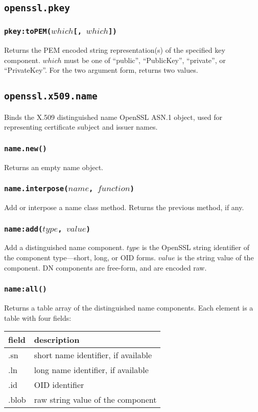 \documentclass[11pt, oneside]{memoir}
\newcommand*{\fn}[1]{\texttt{#1}\xspace}
\newcounter{toccols}
\newenvironment{Module}[1]{
	\subsection{\texttt{#1}}
	\addtocontents{toc}{
		\protect\begin{multicols}{\value{toccols}}
	}
}{
	\addtocontents{toc}{\protect\end{multicols}}
}
\begin{document}
\begin{Module}{openssl.pkey}
\subsubsection[\fn{pkey:toPEM}]{\fn{pkey:toPEM($which$[, $which$])}}

Returns the PEM encoded string representation(s) of the specified key component. $which$ must be one of ``public'', ``PublicKey'', ``private'', or ``PrivateKey''. For the two argument form, returns two values.

\end{Module}


\begin{Module}{openssl.x509.name}

Binds the X.509 distinguished name OpenSSL ASN.1 object, used for representing certificate subject and issuer names.

\subsubsection[\fn{name.new}]{\fn{name.new()}}

Returns an empty name object.

\subsubsection[\fn{name.interpose}]{\fn{name.interpose($name$, $function$)}}

Add or interpose a name class method. Returns the previous method, if any.

\subsubsection[\fn{name:add}]{\fn{name:add($type$, $value$)}}

Add a distinguished name component. $type$ is the OpenSSL string identifier of the component type---short, long, or OID forms. $value$ is the string value of the component. DN components are free-form, and are encoded raw.

\subsubsection[\fn{name:all}]{\fn{name:all()}}

Returns a table array of the distinguished name components. Each element is a table with four fields:

\begin{tabular}{ l | l}
field & description\\\hline
.sn & short name identifier, if available\\
.ln & long name identifier, if available\\
.id & OID identifier\\
.blob & raw string value of the component
\end{tabular}


\end{Module}
\end{document}

